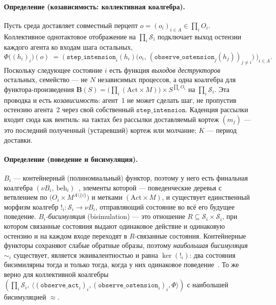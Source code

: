 \documentclass{article}
\newcommand{\method}[1]{\texttt{#1}}
\begin{document}
\paragraph{Определение (козависимость: коллективная коалгебра).}
Пусть среда доставляет совместный перцепт $o=(o_i)_{i\in A}\in\prod_i O_i$.
Коллективное однотактовое отображение на $\prod_i\mathcal{S}_i$
подключает выход остензии каждого агента ко входам шага остальных,
\[
  \Phi\big((h_i)_i\big)(o)\;=\;
  \Big(\ \method{step\_intension}_i(h_i)\big(o_i,\,(\method{observe\_ostension}_j(h_j))_{j\neq i}\big)\ \Big)_{i\in A}.
\]
Поскольку следующее состояние $i$ есть функция \emph{выходов
деструкторов} остальных, семейство --- не $N$ независимых процессов, а
одна коалгебра для функтора-произведения
$\mathbf{B}(S)=\big(\prod_i(\mathrm{Act}\times M)\big)\times S^{\prod_i O_i}$
на $\prod_i\mathcal{S}_i$. Эта проводка и есть \emph{козависимость}:
агент~1 не может сделать шаг, не пропустив остензию агента~2 через свой
собственный $\method{step\_intension}$. Каденция рассылки входит сюда
как вентиль: на тактах без рассылки доставляемый кортеж $(m_j)$ --- это
последний полученный (устаревший) кортеж или молчание; $K$ --- период
доставки.

\paragraph{Определение (поведение и бисимуляция).}
$B_i$ --- контейнерный (полиномиальный) функтор, поэтому у него есть
финальная коалгебра
$(\nu B_i,\ \mathrm{beh}_i)$~\citep{aczel1988nonwellfounded,rutten2000universal},
элементы которой --- поведенческие деревья с ветвлением по
$\big(O_i\times M^{A\setminus\{i\}}\big)$ и метками
$(\mathrm{Act}\times M)$, и существует единственный морфизм коалгебр
$!_i:\mathcal{S}_i\to\nu B_i$, отправляющий состояние во всё его будущее
поведение. \emph{$B_i$-бисимуляция} (bisimulation) --- это отношение
$R\subseteq\mathcal{S}_i\times\mathcal{S}_i$, при котором связанные
состояния выдают одинаковое действие и одинаковую остензию и на каждом
входе переходят в $R$-связанные состояния. Контейнерные функторы
сохраняют слабые обратные образы, поэтому \emph{наибольшая бисимуляция}
$\sim_i$ существует, является эквивалентностью и равна $\ker(!_i)$: два
состояния бисимилярны тогда и только тогда, когда у них одинаковое
поведение~\citep{sangiorgi2011bisimulation}. То же верно для
коллективной коалгебры
$(\prod_i\mathcal{S}_i,\ \langle(\method{observe\_act}_i)_i,(\method{observe\_ostension}_i)_i,\Phi\rangle)$
с наибольшей бисимуляцией $\approx$.
\end{document}
